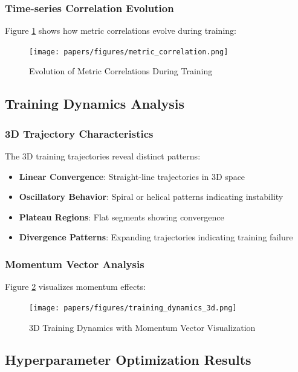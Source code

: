 \documentclass[12pt,a4paper]{article}
\begin{document}
\subsubsection{Time-series Correlation Evolution}

Figure \ref{fig:correlation-evolution} shows how metric correlations evolve during training:

\begin{figure}[H]
\centering
\texttt{[image: papers/figures/metric\_correlation.png]}
\caption{Evolution of Metric Correlations During Training}
\label{fig:correlation-evolution}
\end{figure}

\subsection{Training Dynamics Analysis}

\subsubsection{3D Trajectory Characteristics}

The 3D training trajectories reveal distinct patterns:

\begin{itemize}
    \item \textbf{Linear Convergence}: Straight-line trajectories in 3D space
    \item \textbf{Oscillatory Behavior}: Spiral or helical patterns indicating instability
    \item \textbf{Plateau Regions}: Flat segments showing convergence
    \item \textbf{Divergence Patterns}: Expanding trajectories indicating training failure
\end{itemize}

\subsubsection{Momentum Vector Analysis}

Figure \ref{fig:momentum-analysis} visualizes momentum effects:

\begin{figure}[H]
\centering
\texttt{[image: papers/figures/training\_dynamics\_3d.png]}
\caption{3D Training Dynamics with Momentum Vector Visualization}
\label{fig:momentum-analysis}
\end{figure}

\subsection{Hyperparameter Optimization Results}
\end{document}
